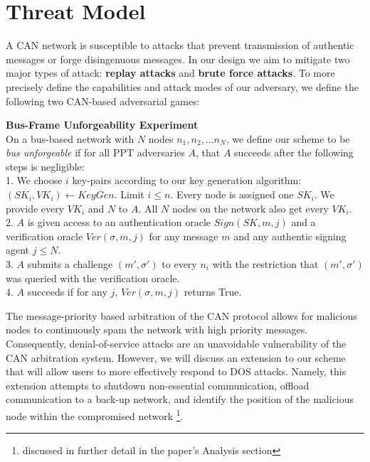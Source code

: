 \documentclass{article}
\begin{document}
\section{Threat Model}

A CAN network is susceptible to attacks that prevent transmission of authentic messages or forge disingenuous messages. In our design we aim to mitigate two major types of attack: \textbf{replay attacks} and \textbf{brute force attacks}. To more precisely define the capabilities and attack modes of our adversary, we define the following two CAN-based adversarial games:\\

\begin{framed}
\noindent \textbf{Bus-Frame Unforgeability Experiment} \\
On a bus-based network with $N$ nodes $n_1, n_2, ... n_N$, we define our scheme to be \textit{bus unforgeable} if for all PPT adversaries $A$, that $A$ succeeds after the following steps is negligible:\\

1. We choose $i$ key-pairs according to our key generation algorithm: $(SK_i, VK_i) \leftarrow KeyGen$. Limit $i \leq n$. Every node is assigned one $SK_i$. We provide every $VK_i$ and $N$ to $A$. All $N$ nodes on the network also get every $VK_i$. \\

2. $A$ is given access to an authentication oracle $Sign(SK, m, j)$ and a verification oracle $Ver(\sigma, m, j)$ for any message $m$ and any authentic signing agent $j \leq N$.\\

3. $A$ submits a challenge $(m',\sigma')$ to every $n_i$ with the restriction that $(m', \sigma')$ was queried with the verification oracle.\\

4. $A$ succeeds if for any $j$, $Ver(\sigma, m, j)$ returns True.
\end{framed}


The message-priority based arbitration of the CAN protocol allows for malicious nodes to continuously spam the network with high priority messages. Consequently, denial-of-service attacks are an unavoidable vulnerability of the CAN arbitration system. However, we will discuss an extension to our scheme that will allow users to more effectively respond to DOS attacks. Namely, this extension attempts to shutdown non-essential communication, offload communication to a back-up network, and identify the position of the malicious node within the compromised network \footnote{discussed in further detail in the paper's Analysis section}.
\end{document}

